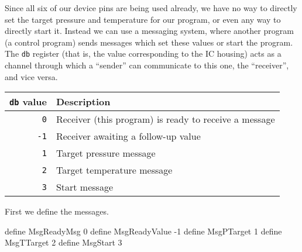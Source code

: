 \documentclass{article}
\begin{document}
Since all six of our device pins are being used already, we have no way
to directly set the target pressure and temperature for our program,
or even any way to directly start it.
Instead we can use a messaging system, where another program (a control program)
sends messages which set these values or start the program.
The \verb+db+ register (that is, the value corresponding to the IC housing)
acts as a channel through which a ``sender'' can communicate to this one,
the ``receiver'', and vice versa.
\begin{center}
    \begin{tabular}{rl}
        \toprule
        \verb+db+ value & Description \\
        \midrule
        \verb+0+        & Receiver (this program) is ready to receive a message \\
        \verb+-1+       & Receiver awaiting a follow-up value \\
        \verb+1+        & Target pressure message \\
        \verb+2+        & Target temperature message \\
        \verb+3+        & Start message \\
        \bottomrule
    \end{tabular}
\end{center}
\begin{paracol}{2}
    First we define the messages.
    \switchcolumn
    \begin{mips}
        define MsgReadyMsg 0
        define MsgReadyValue -1
        define MsgPTarget 1
        define MsgTTarget 2
        define MsgStart 3
    \end{mips}
\end{paracol}
\end{document}
